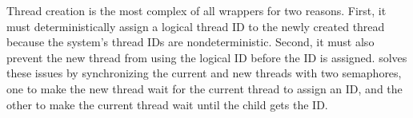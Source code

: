 

Thread creation is the most complex of all wrappers for two reasons.
First, it must deterministically assign a logical thread ID
to the newly created thread because the system's thread IDs are
nondeterministic.  Second, it must also prevent the new thread from using
the logical ID before the ID is assigned.  \xxx solves these issues by
synchronizing the current and new threads with two semaphores, one to make
the new thread wait for the current thread to assign an ID, and the other to
make the current thread wait until the child gets the ID.



